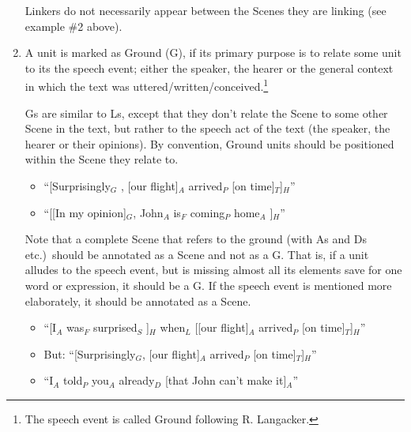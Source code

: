 \documentclass[11pt]{article}
\newcommand{\orig}[1]{{\color{red} {#1}}}
\newcommand{\dn}[1]{{\color{green}{#1}}}
\newcommand{\oa}[1]{{\color{blue}{OA: #1}}}
\begin{document}
\begin{enumerate}
  Linkers do not necessarily appear between the Scenes they are linking (see example \#2 above).

\item
  A unit is marked as {\sc Ground} (G), if its primary purpose is to relate some unit to its 	the speech event; either the speaker, the hearer or the general context in which the text 	 was uttered/written/conceived.\footnote{The speech event is called Ground following R. Langacker.}

  Gs are similar to Ls, except that they don't relate the Scene to some other Scene in the text, but rather to the speech act
  of the text (the speaker, the hearer or their opinions). By convention,
  Ground units should be positioned within the Scene they relate to.

  \begin{itemize}
  \item
    ``[Surprisingly$_G$ , [our flight]$_A$ arrived$_P$ [on time]$_T$]$_H$''
  \item
    ``[[In my opinion]$_G$, John$_A$ is$_F$ coming$_P$ home$_A$ ]$_H$'' 
  \end{itemize}
  
Note that a complete Scene that refers to the ground (with As and Ds etc.)\ should be annotated as a Scene and not as a G. That is, if a unit alludes to the speech event, but is missing almost all its elements save for one word or expression, it should be a G. If the speech event is mentioned more elaborately, it should be annotated as a Scene.

  \begin{itemize}
  \item
    ``[I$_A$ was$_F$ surprised$_S$ ]$_H$ when$_L$ [[our flight]$_A$ arrived$_P$ [on time]$_T$]$_H$''
  \item
    But: ``[Surprisingly$_G$, [our flight]$_A$ arrived$_P$ [on time]$_T$]$_H$''
  \item
    ``I$_A$ told$_P$ you$_A$ already$_D$ [that John can't make it]$_A$''
  \end{itemize}
  
\end{enumerate}
\end{document}
